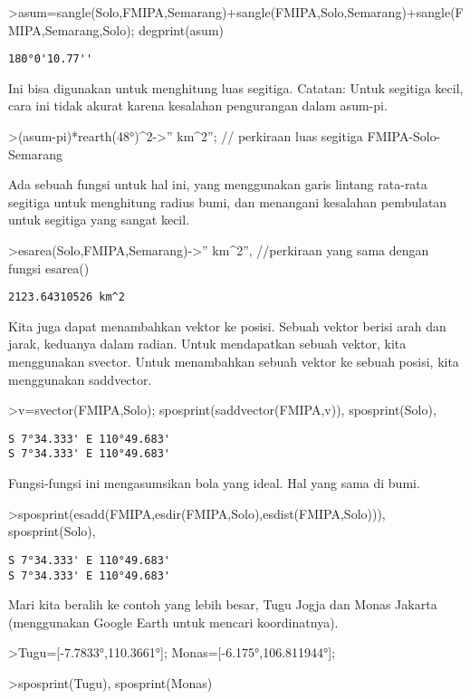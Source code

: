 \documentclass[
]{book}
\begin{document}
\textgreater asum=sangle(Solo,FMIPA,Semarang)+sangle(FMIPA,Solo,Semarang)+sangle(FMIPA,Semarang,Solo); degprint(asum)

\begin{verbatim}
180°0'10.77''
\end{verbatim}

Ini bisa digunakan untuk menghitung luas segitiga. Catatan: Untuk segitiga kecil, cara ini tidak akurat karena kesalahan pengurangan dalam asum-pi.

\textgreater(asum-pi)*rearth(48°)\^{}2-\textgreater'' km\^{}2''; // perkiraan luas segitiga FMIPA-Solo-Semarang

Ada sebuah fungsi untuk hal ini, yang menggunakan garis lintang rata-rata segitiga untuk menghitung radius bumi, dan menangani kesalahan pembulatan untuk segitiga yang sangat kecil.

\textgreater esarea(Solo,FMIPA,Semarang)-\textgreater'' km\^{}2'', //perkiraan yang sama dengan fungsi esarea()

\begin{verbatim}
2123.64310526 km^2
\end{verbatim}

Kita juga dapat menambahkan vektor ke posisi. Sebuah vektor berisi arah dan jarak, keduanya dalam radian. Untuk mendapatkan sebuah vektor, kita menggunakan svector. Untuk menambahkan sebuah vektor ke sebuah posisi, kita menggunakan saddvector.

\textgreater v=svector(FMIPA,Solo); sposprint(saddvector(FMIPA,v)), sposprint(Solo),

\begin{verbatim}
S 7°34.333' E 110°49.683'
S 7°34.333' E 110°49.683'
\end{verbatim}

Fungsi-fungsi ini mengasumsikan bola yang ideal. Hal yang sama di bumi.

\textgreater sposprint(esadd(FMIPA,esdir(FMIPA,Solo),esdist(FMIPA,Solo))), sposprint(Solo),

\begin{verbatim}
S 7°34.333' E 110°49.683'
S 7°34.333' E 110°49.683'
\end{verbatim}

Mari kita beralih ke contoh yang lebih besar, Tugu Jogja dan Monas Jakarta (menggunakan Google Earth untuk mencari koordinatnya).

\textgreater Tugu={[}-7.7833°,110.3661°{]}; Monas={[}-6.175°,106.811944°{]};

\textgreater sposprint(Tugu), sposprint(Monas)
\end{document}
